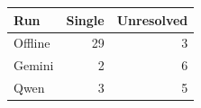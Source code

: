 \renewcommand{\arraystretch}{1.12}
\begin{tabular}{@{}lrr@{}}
\toprule
Run & Single & Unresolved \\ \midrule
Offline & 29 & 3 \\
Gemini & 2 & 6 \\
Qwen & 3 & 5 \\
\bottomrule
\end{tabular}
